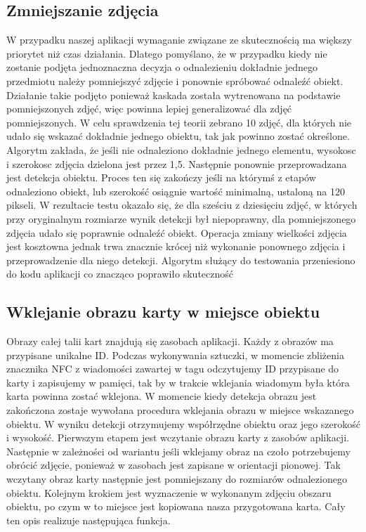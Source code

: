 \documentclass{article}
\numberwithin{equation}{section}
\begin{document}
\subsection{Zmniejszanie zdjęcia}
W przypadku naszej aplikacji wymaganie związane ze skutecznością ma większy priorytet niż czas działania. Dlatego pomyślano, że w przypadku kiedy nie zostanie podjęta jednoznaczna decyzja o odnalezieniu dokładnie jednego przedmiotu należy pomniejszyć zdjęcie i ponownie spróbować odnaleźć obiekt. Działanie takie podjęto ponieważ kaskada została wytrenowana na podstawie pomniejszonych zdjęć, więc powinna lepiej generalizować dla zdjęć pomniejszonych. W celu sprawdzenia tej teorii zebrano 10 zdjęć, dla których nie udało się wskazać dokładnie jednego obiektu, tak jak powinno zostać określone. Algorytm zakłada, że jeśli nie odnaleziono dokładnie jednego elementu, wysokosc i szerokosc zdjęcia dzielona jest przez 1,5. Następnie ponownie przeprowadzana jest detekcja obiektu. Proces ten się zakończy jeśli na którymś z etapów odnaleziono obiekt, lub szerokość osiągnie wartość minimalną, ustaloną na 120 pikseli. W rezultacie testu okazało się, że dla sześciu z dziesięciu zdjęć, w których przy oryginalnym rozmiarze wynik detekcji był niepoprawny, dla pomniejszonego zdjęcia udało się poprawnie odnaleźć obiekt. Operacja zmiany wielkości zdjęcia jest kosztowna jednak trwa znacznie krócej niż wykonanie ponownego zdjęcia i przeprowadzenie dla niego detekcji. Algorytm służący do testowania przeniesiono do kodu aplikacji co znacząco poprawiło skuteczność

\subsection{Wklejanie obrazu karty w miejsce obiektu}

Obrazy całej talii kart znajdują się zasobach aplikacji. Każdy z obrazów ma przypisane unikalne ID. Podczas wykonywania sztuczki, w momencie zbliżenia znacznika NFC z wiadomości zawartej w tagu odczytujemy ID przypisane do karty i zapisujemy w pamięci, tak by w trakcie wklejania wiadomym była która karta powinna zostać wklejona. 
W momencie kiedy detekcja obrazu jest zakończona zostaje wywołana procedura wklejania obrazu w miejsce wskazanego obiektu. W wyniku detekcji otrzymujemy współrzędne obiektu oraz jego szerokość i wysokość. Pierwszym etapem jest wczytanie obrazu karty z zasobów aplikacji. Następnie w zależności od wariantu jeśli wklejamy obraz na czoło potrzebujemy obrócić zdjęcie, ponieważ w zasobach jest zapisane w orientacji pionowej. Tak wczytany obraz karty następnie jest pomniejszany do rozmiarów odnalezionego obiektu. Kolejnym krokiem jest wyznaczenie w wykonanym zdjęciu obszaru obiektu, po czym w to miejsce jest kopiowana nasza przygotowana karta. Cały ten opis realizuje następująca funkcja.
\end{document}
